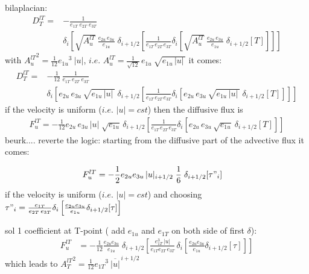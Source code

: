 \documentclass[../tex_main/NEMO_manual]{subfiles}
\begin{document}
bilaplacian:
\begin{equation} \label{eq:tra_ldf_lap}
\begin{split}
D_T^{lT} =&-\frac{1}{e_{1T} \; e_{2T}\;  e_{3T}} \\
& \delta_i \left[  \sqrt{A_u^{lT}}\ \frac{e_{2u}\,e_{3u}}{e_{1u}}\;\delta_{i+1/2} 
		  \left[ \frac{1}{e_{1T}\,e_{2T}\, e_{3T}}
    \delta_i \left[ \sqrt{A_u^{lT}}\ \frac{e_{2u}\,e_{3u}}{e_{1u}}\;\delta_{i+1/2} 
    		  [T] \right] \right] \right]
\end{split}
\end{equation}
with ${A_u^{lT}}^2 = \frac{1}{12} {e_{1u}}^3\ |u|$, 
$i.e.$ $A_u^{lT} = \frac{1}{\sqrt{12}} \,e_{1u}\ \sqrt{ e_{1u}\,|u|\,}$
it comes:
\begin{equation} \label{eq:tra_ldf_lap}
\begin{split}
D_T^{lT} =&-\frac{1}{12}\,\frac{1}{e_{1T} \; e_{2T}\;  e_{3T}} \\
& \delta_i \left[ e_{2u}\,e_{3u}\,\sqrt{ e_{1u}\,|u|\,}\;\delta_{i+1/2} 
		 \left[ \frac{1}{e_{1T}\,e_{2T}\, e_{3T}} 
    \delta_i \left[ e_{2u}\,e_{3u}\,\sqrt{ e_{1u}\,|u|\,}\;\delta_{i+1/2} 
    		[T] \right] \right] \right]
\end{split}
\end{equation}
if the velocity is uniform ($i.e.$ $|u|=cst$) then the diffusive flux is
\begin{equation} \label{eq:tra_ldf_lap}
\begin{split}
F_u^{lT} = - \frac{1}{12}
 e_{2u}\,e_{3u}\,|u| \;\sqrt{ e_{1u}}\,\delta_{i+1/2} 
		 \left[ \frac{1}{e_{1T}\,e_{2T}\, e_{3T}} 
    \delta_i \left[ e_{2u}\,e_{3u}\,\sqrt{ e_{1u}}\:\delta_{i+1/2} 
    		[T] \right] \right]
\end{split}
\end{equation}
beurk....  reverte the logic: starting from the diffusive part of the advective flux it comes:

\begin{equation} \label{eq:tra_adv_ubs2}
\begin{split}
F_u^{lT}
&= - \frac{1}{2} e_{2u} e_{3u}\,|u|_{i+1/2} \;\frac{1}{6} \;\delta_{i+1/2}[\tau"_i]
\end{split}
\end{equation}
if the velocity is uniform ($i.e.$ $|u|=cst$) and
choosing $\tau "_i =\frac{e_{1T}}{e_{2T}\,e_{3T}}\delta_i \left[ \frac{e_{2u} e_{3u} }{e_{1u} } \delta_{i+1/2}[\tau] \right]$

sol 1 coefficient at T-point ( add $e_{1u}$ and $e_{1T}$ on both side of first $\delta$):
\begin{equation} \label{eq:tra_adv_ubs2}
\begin{split}
F_u^{lT}
&= - \frac{1}{12} \frac{e_{2u} e_{3u}}{e_{1u}}\;\delta_{i+1/2}\left[ \frac{e_{1T}^3\,|u|}{e_{1T}e_{2T}\,e_{3T}}\,\delta_i \left[ \frac{e_{2u} e_{3u} }{e_{1u} } \delta_{i+1/2}[\tau] \right] \right]
\end{split}
\end{equation}
which leads to ${A_T^{lT}}^2 = \frac{1}{12} {e_{1T}}^3\ \overline{|u|}^{\,i+1/2}$
\end{document}
